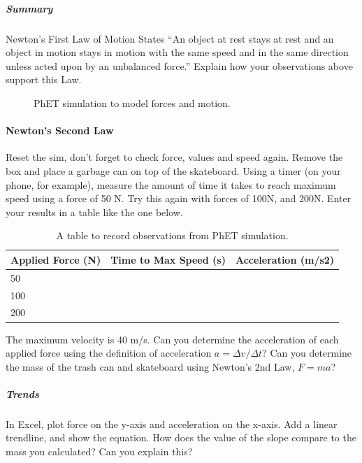 \subparagraph{Summary}

Newton's First Law of Motion States ``An object at rest stays at rest and an object in motion stays in motion with the same speed and in the same direction unless acted upon by an unbalanced force.'' Explain how your observations above support this Law.

\begin{figure}[!htbp]
\centering
\caption[]{PhET simulation to model forces and motion.}
\label{phet:newtonslaws:ForcesAndMotion}
\end{figure}

\paragraph{Newton's Second Law}

Reset the sim, don't forget to check force, values and speed again. Remove the box and place a garbage can on top of the skateboard. Using a timer (on your phone, for example), measure the amount of time it takes to reach maximum speed using a force of 50 N. Try this again with forces of 100N, and 200N. Enter your results in a table like the one below.

\begin{table}
\centering
\caption[]{A table to record observations from PhET simulation.}
\label{table:newtonslaws:phetsim}
\begin{tabular}{p{}p{}p{}}
\toprule
Applied Force (N) & Time to Max Speed (s) & Acceleration (m/s2) \\
\hline
50 &  &  \\
100 &  &  \\
200 &  &  \\
\bottomrule
\end{tabular}
\end{table}

The maximum velocity is 40 m/s. Can you determine the acceleration of each applied force using the definition of acceleration  $a=\Delta v/\Delta t$? Can you determine the mass of the trash can and skateboard using Newton's 2nd Law,  $F=ma$?

\subparagraph{Trends}

In Excel, plot force on the y-axis and acceleration on the x-axis. Add a linear trendline, and show the equation. How does the value of the slope compare to the mass you calculated? Can you explain this?

